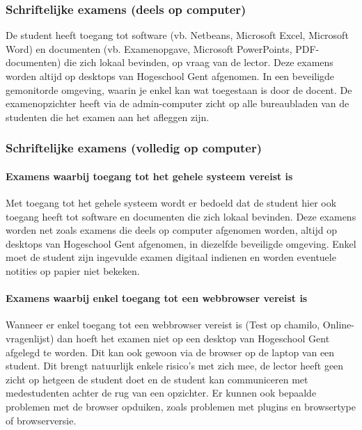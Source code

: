 \subsubsection{Schriftelijke examens (deels op computer) }

De student heeft toegang tot software (vb. Netbeans, Microsoft Excel, Microsoft Word) en documenten (vb. Examenopgave, Microsoft PowerPoints, PDF-documenten) die zich lokaal bevinden, op vraag van de lector. Deze examens worden altijd op desktops van Hogeschool Gent afgenomen. In een beveiligde gemonitorde omgeving, waarin je enkel kan wat toegestaan is door de docent. De examenopzichter heeft via de admin-computer zicht op alle bureaubladen van de studenten die het examen aan het afleggen zijn. 




\subsubsection{Schriftelijke examens (volledig op computer)}

\paragraph{Examens waarbij toegang tot het gehele systeem vereist is}

Met toegang tot het gehele systeem wordt er bedoeld dat de student hier ook toegang heeft tot software  en documenten die zich lokaal bevinden. Deze examens worden net zoals examens die deels op computer afgenomen worden, altijd op desktops van Hogeschool Gent afgenomen, in diezelfde beveiligde omgeving. Enkel moet de student zijn ingevulde examen digitaal indienen en worden eventuele notities op papier niet bekeken.  

\paragraph{Examens waarbij enkel toegang tot een webbrowser vereist is}

Wanneer er enkel toegang tot een webbrowser vereist is (Test op chamilo, Online-vragenlijst) dan hoeft het examen niet op een desktop van Hogeschool Gent afgelegd te worden. Dit kan ook gewoon via de browser op de laptop van een student. Dit brengt natuurlijk enkele risico's met zich mee, de lector heeft geen zicht op hetgeen de student doet en de student kan communiceren met medestudenten achter de rug van een opzichter. Er kunnen ook bepaalde problemen met de browser opduiken, zoals problemen met plugins en browsertype of browserversie. 

